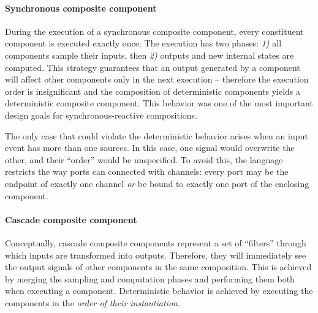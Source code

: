 \paragraph{Synchronous composite component} 
During the execution of a synchronous composite component, every constituent component is executed exactly once. The execution has two phases: \textit{1)} all components sample their inputs, then \textit{2)} outputs and new internal states are computed. This strategy guarantees that an output generated by a component will affect other components only in the next execution -- therefore the execution order is insignificant and the composition of deterministic components yields a deterministic composite component. This behavior was one of the most important design goals for synchronous-reactive compositions.

The only case that could violate the deterministic behavior arises when an input event has more than one sources. In this case, one signal would overwrite the other, and their ``order'' would be unspecified. To avoid this, the language restricts the way ports can connected with channels: every port may be the endpoint of exactly one channel \emph{or} be bound to exactly one port of the enclosing component.

\paragraph{Cascade composite component} Conceptually, cascade composite components represent a set of ``filters'' through which inputs are transformed into outputs. Therefore, they will immediately see the output signals of other components in the same composition. This is achieved by merging the sampling and computation phases and performing them both when executing a component. Deterministic behavior is achieved by executing the components in the \emph{order of their instantiation}.

